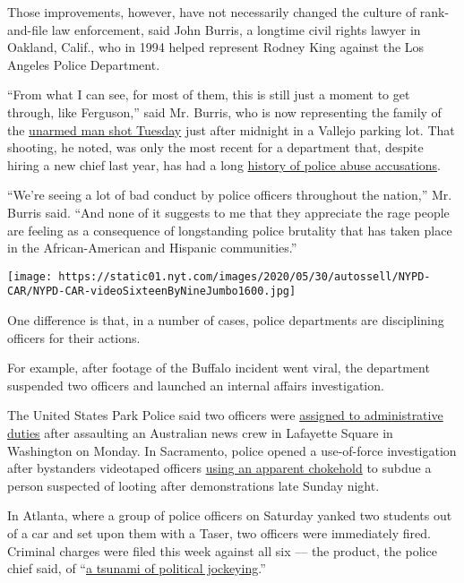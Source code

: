 Those improvements, however, have not necessarily changed the culture of
rank-and-file law enforcement, said John Burris, a longtime civil rights
lawyer in Oakland, Calif., who in 1994 helped represent Rodney King
against the Los Angeles Police Department.

``From what I can see, for most of them, this is still just a moment to
get through, like Ferguson,'' said Mr. Burris, who is now representing
the family of the
\href{https://www.nbcnews.com/news/us-news/police-vallejo-calif-fatally-shoot-man-hammer-kneeling-outside-walgreens-n1224621}{unarmed
man shot Tuesday} just after midnight in a Vallejo parking lot. That
shooting, he noted, was only the most recent for a department that,
despite hiring a new chief last year, has had a long
\href{https://www.kqed.org/news/11768008/the-life-and-death-of-willie-mccoy}{history
of police abuse accusations}.

``We're seeing a lot of bad conduct by police officers throughout the
nation,'' Mr. Burris said. ``And none of it suggests to me that they
appreciate the rage people are feeling as a consequence of longstanding
police brutality that has taken place in the African-American and
Hispanic communities.''

\texttt{[image: https://static01.nyt.com/images/2020/05/30/autossell/NYPD-CAR/NYPD-CAR-videoSixteenByNineJumbo1600.jpg]}

One difference is that, in a number of cases, police departments are
disciplining officers for their actions.

For example, after footage of the Buffalo incident went viral, the
department suspended two officers and launched an internal affairs
investigation.

The United States Park Police said two officers were
\href{https://twitter.com/JvittalTV/status/1268306972685844480?s=20}{assigned
to administrative duties} after assaulting an Australian news crew in
Lafayette Square in Washington on Monday. In Sacramento, police opened a
use-of-force investigation after bystanders videotaped officers
\href{https://twitter.com/RationalDis/status/1268278251899797505}{using
an apparent chokehold} to subdue a person suspected of looting after
demonstrations late Sunday night.

In Atlanta, where a group of police officers on Saturday yanked two
students out of a car and set upon them with a Taser, two officers were
immediately fired. Criminal charges were filed this week against all six
--- the product, the police chief said, of
``\href{https://www.ajc.com/news/local/atlanta-police-chief-says-charges-against-officers-are-political/afQRm3nM431DlyGyqEjY3K/}{a
tsunami of political jockeying}.''

